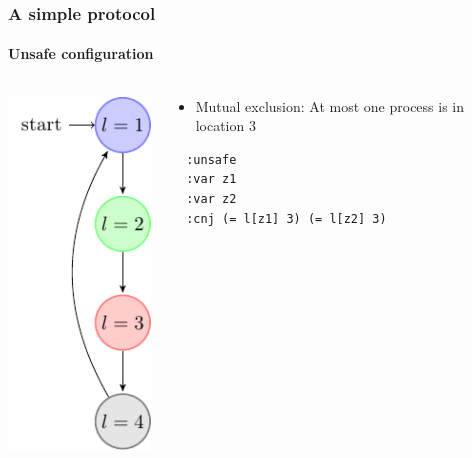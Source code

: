 \begin{frame}[fragile]
  \frametitle{A simple protocol}
  \framesubtitle{Unsafe configuration}

  \begin{columns}
  \begin{column}{0.3\textwidth}
  \centering
  \includegraphics{pictures/demo-prot1-fig}
  \end{column}
  \begin{column}{0.7\textwidth}
  
  \begin{itemize}
    \item Mutual exclusion: At most one process is in location $3$
  \end{itemize}

\pause


\pause
  
  \begin{verbatim}
  :unsafe
  :var z1
  :var z2
  :cnj (= l[z1] 3) (= l[z2] 3)
  \end{verbatim}
\end{column}

\end{columns}  

\end{frame}

